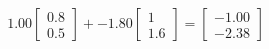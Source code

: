 \documentclass[preview]{standalone}
\begin{document}
\begin{align*}
1.00 \begin{bmatrix} 0.8 \\ 0.5 \end{bmatrix} + -1.80 \begin{bmatrix} 1 \\ 1.6 \end{bmatrix} = \begin{bmatrix} -1.00 \\ -2.38 \end{bmatrix}
\end{align*}
\end{document}
